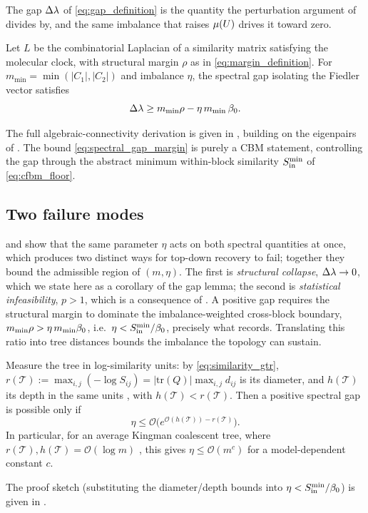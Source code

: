 The gap $\Delta\lambda$ of \eqref{eq:gap_definition} is the quantity the perturbation
argument of  divides by, and the same imbalance that raises $\mu(U)$
drives it toward zero.

\begin{lemma}\label{lem:gap}
Let $L$ be the combinatorial Laplacian of a similarity matrix satisfying the
molecular clock, with structural margin $\rho$ as in \eqref{eq:margin_definition}. For
$m_{\min}=\min(|C_1|,|C_2|)$ and imbalance $\eta$, the spectral gap isolating the Fiedler
vector satisfies
\begin{equation}\label{eq:spectral_gap_margin}
   \Delta\lambda \ge m_{\min}\rho-\eta\,m_{\min}\,\beta_0.
\end{equation}
\end{lemma}
\noindent The full algebraic-connectivity derivation is given in ,
building on the eigenpairs of . The bound
\eqref{eq:spectral_gap_margin} is purely a CBM statement, controlling the gap
through the abstract minimum within-block similarity $S_{\mathrm{in}}^{\min}$ of
\eqref{eq:cfbm_floor}.

\subsection{Two failure modes}\label{sec:bridging-failure}

 and  show that the same parameter $\eta$ acts
on both spectral quantities at once, which produces two distinct ways for
top-down recovery to fail; together they bound the admissible region of
$(m,\eta)$. The first is \emph{structural collapse},
$\Delta\lambda\to0$, which we state here as a corollary of the gap lemma; the second is
\emph{statistical infeasibility}, $p>1$, which is a consequence of
. A positive gap requires the structural margin to
dominate the imbalance-weighted cross-block boundary,
$m_{\min}\rho>\eta\,m_{\min}\beta_0$, i.e.\
$\eta<S_{\mathrm{in}}^{\min}/\beta_0$, precisely what  records.
Translating this
ratio into tree distances bounds the imbalance the topology can sustain.

\begin{corollary}\label{cor:tolerance}
Measure the tree in log-similarity units: by \eqref{eq:similarity_gtr},
$r(\mathcal T):=\max_{i,j}(-\log S_{ij})=|\mathrm{tr}(Q)|\max_{i,j}d_{ij}$ is its diameter,
and $h(\mathcal T)$ its depth in the same units \cite{aizenbud2023spectral}, with
$h(\mathcal T)<r(\mathcal T)$.
Then a positive spectral gap is possible only if
\begin{equation}\label{eq:eta_distance_bound}
   \eta\le\mathcal O\!\bigl(e^{\mathcal O(h(\mathcal T))-r(\mathcal T)}\bigr).
\end{equation}
In particular, for an average Kingman coalescent tree, where
$r(\mathcal T),h(\mathcal T)=\mathcal O(\log m)$
\cite{erdos1999logs, aldous2001stochastic}, this gives $\eta\le\mathcal O(m^c)$ for
a model-dependent constant $c$.
\end{corollary}
\noindent The proof sketch (substituting the diameter/depth bounds into
$\eta<S_{\mathrm{in}}^{\min}/\beta_0$) is given in \Cref{app:comp1}.

